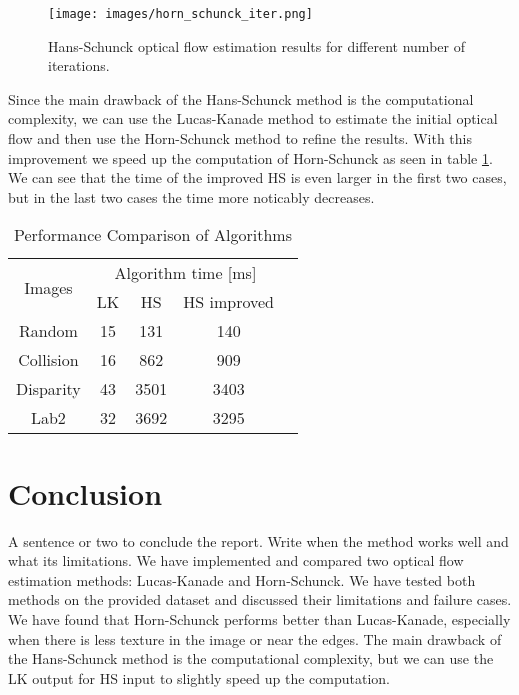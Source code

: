 \documentclass[9pt]{IEEEtran}
\begin{document}
\begin{figure}[htb]
    \centering
    \texttt{[image: images/horn\_schunck\_iter.png]}
    \caption{Hans-Schunck optical flow estimation results for different number of iterations.}
    \label{fig:horn_schunck_iter}
\end{figure}

Since the main drawback of the Hans-Schunck method is the computational complexity, we can use the Lucas-Kanade method to estimate the initial optical flow and then use the Horn-Schunck method to refine the results. 
With this improvement we speed up the computation of Horn-Schunck as seen in table \ref{tab:performance}. We can see that the time of the improved HS is even larger in the first two cases, but in the last two cases the time more noticably decreases.


\begin{table}[htbp]
    \centering
    \caption{Performance Comparison of Algorithms}
    \begin{tabular}{|c|c|c|c|c|}
        \hline
        \multirow{2}{*}{Images} & \multicolumn{3}{c|}{Algorithm time [ms]} \\
        \cline{2-4}
         & LK & HS & HS improved \\
        \hline
        Random & 15 & 131 & 140 \\
        Collision & 16 & 862 & 909 \\
        Disparity & 43 & 3501  & 3403 \\
        Lab2 & 32 & 3692 & 3295 \\
        \hline
    \end{tabular}
    \label{tab:performance}
\end{table}

\section{Conclusion}

A sentence or two to conclude the report. Write when the method works well and what its limitations.
We have implemented and compared two optical flow estimation methods: Lucas-Kanade and Horn-Schunck. We have tested both methods on the provided dataset and discussed their limitations and failure cases.
We have found that Horn-Schunck performs better than Lucas-Kanade, especially when there is less texture in the image or near the edges.
The main drawback of the Hans-Schunck method is the computational complexity, but we can use the LK output for HS input to slightly speed up the computation. 





\end{document}
